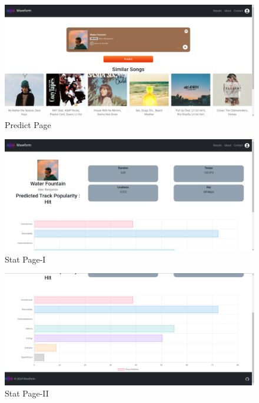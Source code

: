 \documentclass[11pt]{report}
\begin{document}
\begin{figure}[h]
    \centering
    \includegraphics[width=1\linewidth]{screenshots/4.predict.png}
    \caption{Predict Page}
   
\end{figure}

\begin{figure}[h]
    \centering
    \includegraphics[width=1\linewidth]{screenshots/5.stat.png}
    \caption{Stat Page-I}
  
\end{figure}

\begin{figure}[h]
    \centering
    \includegraphics[width=\linewidth]{screenshots/6.stat.png}
    \caption{Stat Page-II}
   
\end{figure}
\end{document}
